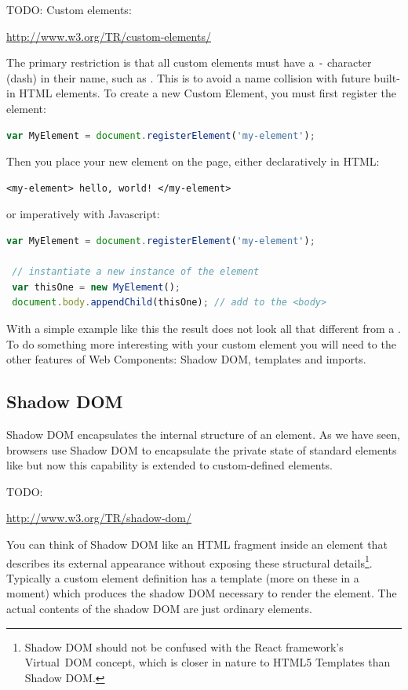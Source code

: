 TODO: Custom elements:

\url{http://www.w3.org/TR/custom-elements/}

The primary restriction is that all custom elements must have a \texttt{-} character (dash) in their name, such as . 
This is to avoid a name collision with future built-in HTML elements. 
To create a new Custom Element, you must first register the element:

\begin{lstlisting}[language=JavaScript,numbers=none]
 var MyElement = document.registerElement('my-element');
\end{lstlisting}

Then you place your new element on the page, either declaratively in HTML:

\begin{lstlisting}[language=HTML5,numbers=none]
 <my-element> hello, world! </my-element>
\end{lstlisting}

or imperatively with Javascript:

\begin{lstlisting}[language=JavaScript,numbers=none]
 var MyElement = document.registerElement('my-element');

 // instantiate a new instance of the element
 var thisOne = new MyElement();      
 document.body.appendChild(thisOne); // add to the <body>
\end{lstlisting}

With a simple example like this the result does not look all that different from a .
To do something more interesting with your custom element you will need to the other features of Web Components: Shadow DOM, templates and imports.

\subsection{Shadow DOM}
Shadow DOM encapsulates the internal structure of an element. 
As we have seen, browsers use Shadow DOM to encapsulate the private state of standard elements like  but now this capability is extended to custom-defined elements.

TODO: 

\url{http://www.w3.org/TR/shadow-dom/}

You can think of Shadow DOM like an HTML fragment inside an element that describes its external appearance without exposing these structural details\footnote{
Shadow DOM should not be confused with the React framework's Virtual~DOM concept, which is closer in nature to HTML5 Templates than Shadow DOM.
}. Typically a custom element definition has a template (more on these in a moment) which produces the shadow DOM necessary to render the element.
The actual contents of the shadow DOM are just ordinary elements.

